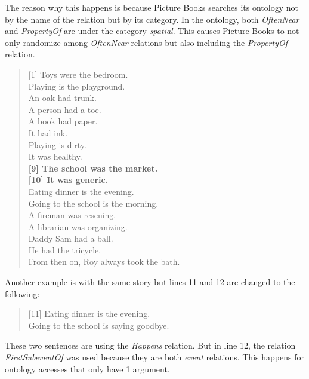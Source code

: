 The reason why this happens is because Picture Books searches its ontology not by the name of the relation but by its category. In the ontology, both \textit{OftenNear} and \textit{PropertyOf} are under the category \textit{spatial}. This causes Picture Books to not only randomize among \textit{OftenNear} relations but also including the \textit{PropertyOf} relation.

\begin{verse}
[1]  Toys were the bedroom.\\
[2]  Playing is the playground.\\
[3]  An oak had trunk.\\
[4]  A person had a toe.\\
[5]  A book had paper.\\
[6]  It had ink.\\
[7]  Playing is dirty.\\
[8]  It was healthy.\\
\textbf{[9]  The school was the market.}\\
\textbf{[10] It was generic.}\\
[11] Eating dinner is the evening.\\
[12] Going to the school is the morning.\\
[13] A fireman was rescuing.\\
[14] A librarian was organizing.\\
[15] Daddy Sam had a ball.\\
[16] He had the tricycle.\\
[17] From then on, Roy always took the bath.\\
\end{verse}

Another example is with the same story but lines 11 and 12 are changed to the following:

\begin{verse}
[11] Eating dinner is the evening.\\
[12] Going to the school is saying goodbye.\\
\end{verse}

These two sentences are using the \textit{Happens} relation. But in line 12, the relation \textit{FirstSubeventOf} was used because they are both \textit{event} relations. This happens for ontology accesses that only have 1 argument.









